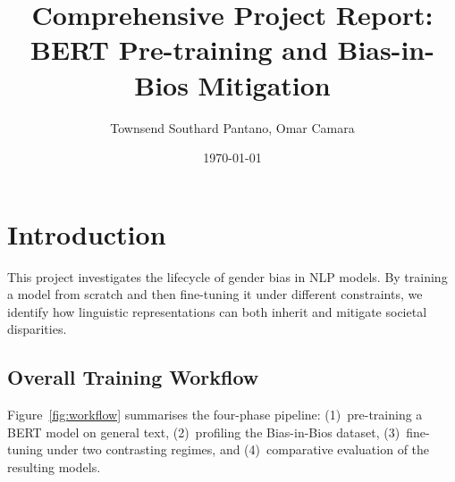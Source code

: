 \documentclass[11pt,letterpaper,twocolumn]{article}
\title{\textbf{Comprehensive Project Report:\\
		BERT Pre-training and Bias-in-Bios Mitigation}}
\author{Townsend Southard Pantano, Omar Camara}
\date{\today}
\begin{document}
	
	
	\section{Introduction}
	This project investigates the lifecycle of gender bias in NLP models. By training a model
	from scratch and then fine-tuning it under different constraints, we identify how linguistic
	representations can both inherit and mitigate societal disparities.
	
	\subsection{Overall Training Workflow}
	Figure~\ref{fig:workflow} summarises the four-phase pipeline: (1)~pre-training a BERT model
	on general text, (2)~profiling the Bias-in-Bios dataset, (3)~fine-tuning under two
	contrasting regimes, and (4)~comparative evaluation of the resulting models.
	
\end{document}
